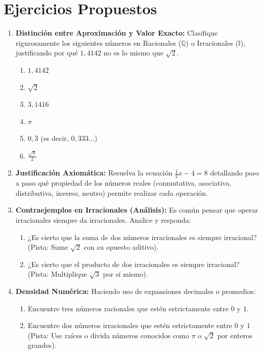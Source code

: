 \section{Ejercicios Propuestos}

\begin{enumerate}
    \item \textbf{Distinción entre Aproximación y Valor Exacto:}
    Clasifique rigurosamente los siguientes números en Racionales ($\mathbb{Q}$) o Irracionales ($\mathbb{I}$), justificando por qué $1,4142$ no es lo mismo que $\sqrt{2}$.
    \begin{enumerate}
        \item $1,4142$
        \item $\sqrt{2}$
        \item $3,1416$
        \item $\pi$
        \item $0,\overline{3}$ (es decir, $0,333\dots$)
        \item $\frac{\sqrt{9}}{2}$
    \end{enumerate}

    \item \textbf{Justificación Axiomática:}
    Resuelva la ecuación $\frac{1}{2}x - 4 = 8$ detallando paso a paso qué propiedad de los números reales (conmutativa, asociativa, distributiva, inverso, neutro) permite realizar cada operación.

    \item \textbf{Contraejemplos en Irracionales (Análisis):}
    Es común pensar que operar irracionales siempre da irracionales. Analice y responda:
    \begin{enumerate}
        \item ¿Es cierto que la suma de dos números irracionales es siempre irracional? (Pista: Sume $\sqrt{2}$ con su opuesto aditivo).
        \item ¿Es cierto que el producto de dos irracionales es siempre irracional? (Pista: Multiplique $\sqrt{3}$ por sí mismo).
    \end{enumerate}

    \item \textbf{Densidad Numérica:}
    Haciendo uso de expansiones decimales o promedios:
    \begin{enumerate}
        \item Encuentre tres números racionales que estén estrictamente entre $0$ y $1$.
        \item Encuentre dos números irracionales que estén estrictamente entre $0$ y $1$ (Pista: Use raíces o divida números conocidos como $\pi$ o $\sqrt{2}$ por enteros grandes).
    \end{enumerate}


\end{enumerate}
